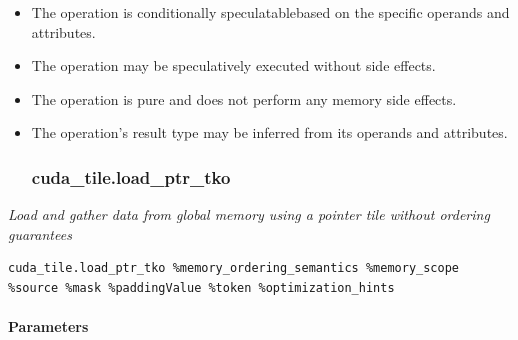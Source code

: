\documentclass{article}
\begin{document}
\begin{itemize}
\item The operation is conditionally speculatablebased on the specific operands and attributes.
\item The operation may be speculatively executed without side effects.
\item The operation is pure and does not perform any memory side effects.
\item The operation's result type may be inferred from its operands and attributes.


\subsubsection{cuda\_tile.load\_ptr\_tko}

\end{itemize}
\textit{Load and gather data from global memory using a pointer tile without ordering guarantees}


\begin{lstlisting}
cuda_tile.load_ptr_tko %memory_ordering_semantics %memory_scope %source %mask %paddingValue %token %optimization_hints
\end{lstlisting}

\paragraph{Parameters}
\end{document}
